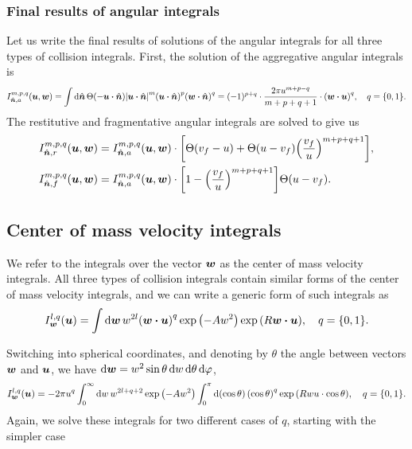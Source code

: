\documentclass[aps,prl,preprint,groupedaddress,10pt]{revtex4-2}
\begin{document}
\subsubsection{Final results of angular integrals}
Let us write the final results of solutions of the angular integrals for all three types
of collision integrals. First, the solution of the aggregative angular integrals is
\begin{equation}
    I_{\bn,a}^{m,p,q}(\bu,\bw)=\int\dd{\bn}\Theta\pqty{-\bu\vdot\bn}
    \abs{\bu\vdot\bn}^m\pqty{\bu\vdot\bn}^p\pqty{\bw\vdot\bn}^q=
    (-1)^{p+q}\cdot\frac{2\pi u^{m+p-q}}{m+p+q+1}
    \cdot\pqty{\bw\vdot\bu}^{q},\quad q=\Bqty{0,1}.
\end{equation}
The restitutive and fragmentative angular integrals are solved to give us
\begin{equation}
    \begin{split}
        I_{\bn,r}^{m,p,q}(\bu,\bw)&=I_{\bn,a}^{m,p,q}(\bu,\bw)\cdot
        \bqty{\Theta\pqty{v_f-u}+\Theta\pqty{u-v_f}
            \pqty{\frac{v_f}{u}}^{m+p+q+1}},\\
        I_{\bn,f}^{m,p,q}(\bu,\bw)&=I_{\bn,a}^{m,p,q}(\bu,\bw)\cdot
        \bqty{1-\pqty{\frac{v_f}{u}}^{m+p+q+1}}
        \Theta\pqty{u-v_f}.
    \end{split}
\end{equation}

\subsection{Center of mass velocity integrals}
We refer to the integrals over the vector $\vb*{w}$ as the center of mass velocity
integrals. All three types of collision integrals contain similar forms of the
center of mass velocity integrals, and we can write a generic form of such integrals
as
\begin{equation}
    I_{\bw}^{l,q}(\bu)=\int\dd{\bw}w^{2l}\pqty{\bw\vdot\bu}^q\exp\pqty{-Aw^2}
    \exp\pqty{R\bw\vdot\bu},\quad q=\Bqty{0,1}.
\end{equation}

Switching into spherical coordinates, and denoting by $\theta$ the angle between vectors
$\vb*{w}$ and $\vb*{u}$, we have $\dd{\vb*{w}}=w^2\sin\theta\dd{w}\dd{\theta}\dd{\varphi}$,
\begin{equation}
    I_{\bw}^{l,q}(\bu)=-2\pi u^q\int_0^{\infty}\dd{w}w^{2l+q+2}\exp\pqty{-Aw^2}
    \int_0^{\pi}\dd{\pqty{\cos\theta}}\pqty{\cos\theta}^q\exp\pqty{Rwu\cdot\cos\theta},
    \quad q=\Bqty{0,1}.
\end{equation}
Again, we solve these integrals for two different cases of $q$, starting with the
simpler case
\end{document}
